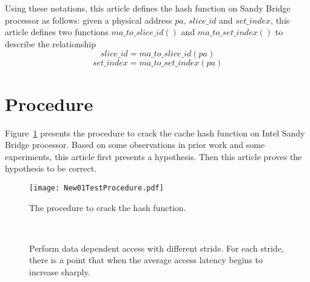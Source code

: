 \documentclass[conference]{IEEEtran}
\newcommand{\SliceID}{slice\_id }
\newcommand{\SetIndex}{set\_index}
\newcommand{\PhysicalAddressAbbreviation}{pa}
\newcommand{\MA}{\PhysicalAddressAbbreviation}
\newcommand{\MATOSliceID}{ma\_to\_slice\_id}
\newcommand{\MATOSetIndex}{ma\_to\_set\_index}
\newcommand{\SandyBridge}{Sandy Bridge }
\begin{document}
Using these notations, this article defines the hash function on \SandyBridge processor as follows: given a physical address $\MA$, $\SliceID$ and $\SetIndex$, this article defines two functions $\MATOSliceID\left(\right)$ and $\MATOSetIndex\left(\right)$ to describe the relationship
\begin{equation}
	\SliceID = ma\_to\_slice\_id\left(\MA\right) 
\end{equation}
\begin{equation}
	\SetIndex = ma\_to\_set\_index\left(\MA\right)
\end{equation}
\section{Procedure}
Figure~\ref{fig:TestProcedure} presents the procedure to crack the cache hash function on Intel Sandy Bridge processor. Based on some observations in prior work and some experiments, this article first presents a hypothesis. Then this article proves the hypothesis to be correct. 
\begin{figure}[!htbp]
\centering
\texttt{[image: New01TestProcedure.pdf]}
\caption{The procedure to crack the hash function.}
\label{fig:TestProcedure}
\end{figure}
\begin{figure*}[!htbp]
\centering
{}
	~
        ~
	~
	\caption{Perform data dependent access with different stride. For each stride, there is a point that when the average access latency begins to increase sharply.}
	\label{fig:SetIndexBits}
\end{figure*}
\end{document}
